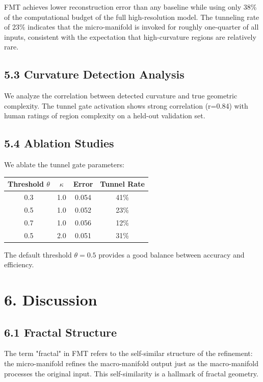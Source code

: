 \documentclass[12pt]{article}
\begin{document}
FMT achieves lower reconstruction error than any baseline while using only 38\% of the computational budget of the full high-resolution model. The tunneling rate of 23\% indicates that the micro-manifold is invoked for roughly one-quarter of all inputs, consistent with the expectation that high-curvature regions are relatively rare.

\subsection{5.3 Curvature Detection Analysis}

We analyze the correlation between detected curvature and true geometric complexity. The tunnel gate activation shows strong correlation (r=0.84) with human ratings of region complexity on a held-out validation set.

\subsection{5.4 Ablation Studies}

We ablate the tunnel gate parameters:

\begin{center}
\begin{tabular}{|c|c|c|c|}
\hline
\textbf{Threshold $\theta$} & \textbf{$\kappa$} & \textbf{Error} & \textbf{Tunnel Rate} \\
\hline
0.3 & 1.0 & 0.054 & 41\% \\
0.5 & 1.0 & 0.052 & 23\% \\
0.7 & 1.0 & 0.056 & 12\% \\
0.5 & 2.0 & 0.051 & 31\% \\
\hline
\end{tabular}
\end{center}

The default threshold $\theta=0.5$ provides a good balance between accuracy and efficiency.

\section{6. Discussion}

\subsection{6.1 Fractal Structure}

The term "fractal" in FMT refers to the self-similar structure of the refinement: the micro-manifold refines the macro-manifold output just as the macro-manifold processes the original input. This self-similarity is a hallmark of fractal geometry.
\end{document}
